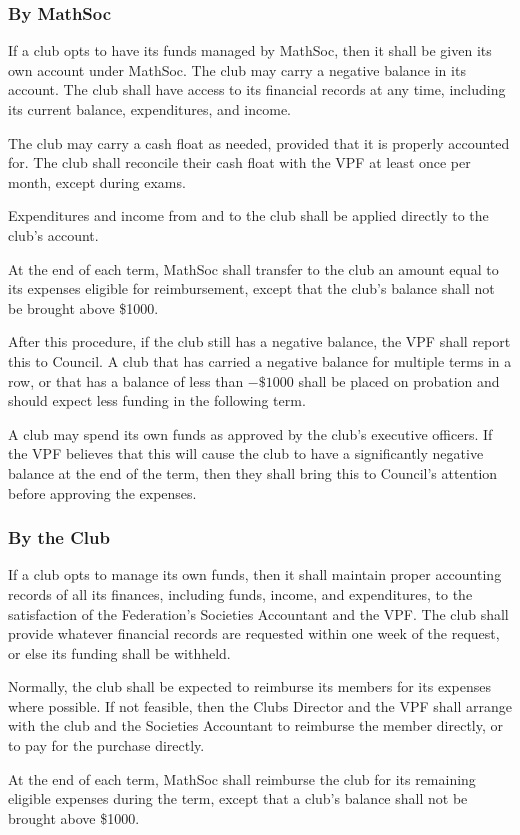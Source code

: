 \subsubsection{By MathSoc} 
If a club opts to have its funds managed by MathSoc, then it shall be given its
own account under MathSoc. The club may carry a negative balance in its account.
The club shall have access to its financial records at any time, including its
current balance, expenditures, and income.

The club may carry a cash float as needed, provided that it is properly
accounted for. The club shall reconcile their cash float with the VPF at least
once per month, except during exams.

Expenditures and income from and to the club shall be applied directly to the
club's account.

At the end of each term, MathSoc shall transfer to the club an amount equal to
its expenses eligible for reimbursement, except that the club's balance shall
not be brought above \$1000.

After this procedure, if the club still has a negative balance, the VPF shall
report this to Council. A club that has carried a negative balance for multiple
terms in a row, or that has a balance of less than $-\$1000$ shall be placed on
probation and should expect less funding in the following term.

A club may spend its own funds as approved by the club's executive officers. If
the VPF believes that this will cause the club to have a significantly negative
balance at the end of the term, then they shall bring this to Council's
attention before approving the expenses.

\subsubsection{By the Club}
If a club opts to manage its own funds, then it shall maintain proper accounting
records of all its finances, including funds, income, and expenditures, to the
satisfaction of the Federation's Societies Accountant and the VPF. The club
shall provide whatever financial records are requested within one week of the
request, or else its funding shall be withheld.

Normally, the club shall be expected to reimburse its members for its expenses
where possible. If not feasible, then the Clubs Director and the VPF shall
arrange with the club and the Societies Accountant to reimburse the member
directly, or to pay for the purchase directly.

At the end of each term, MathSoc shall reimburse the club for its remaining
eligible expenses during the term, except that a club's balance shall not be
brought above \$1000.
